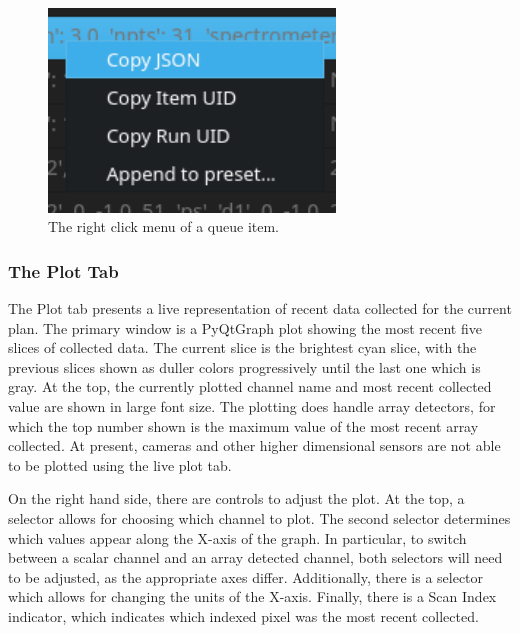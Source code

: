 \begin{figure}
\includegraphics[width=3in]{"acquisition/images/right_click_menu"}
\caption[Right click menu]{
	The right click menu of a queue item.
}
\label{acq:fig:right_click}
\end{figure}

\subsubsection{The Plot Tab}

The Plot tab presents a live representation of recent data collected for the current plan.
The primary window is a PyQtGraph\cite{pyqtgraph} plot showing the most recent five slices of collected data.
The current slice is the brightest cyan slice, with the previous slices shown as duller colors progressively until the last one which is gray.
At the top, the currently plotted channel name and most recent collected value are shown in large font size.
The plotting does handle array detectors, for which the top number shown is the maximum value of the most recent array collected.
At present, cameras and other higher dimensional sensors are not able to be plotted using the live plot tab.

On the right hand side, there are controls to adjust the plot.
At the top, a selector allows for choosing which channel to plot.
The second selector determines which values appear along the X-axis of the graph.
In particular, to switch between a scalar channel and an array detected channel, both selectors will need to be adjusted, as the appropriate axes differ.
Additionally, there is a selector which allows for changing the units of the X-axis.
Finally, there is a Scan Index indicator, which indicates which indexed pixel was the most recent collected.

